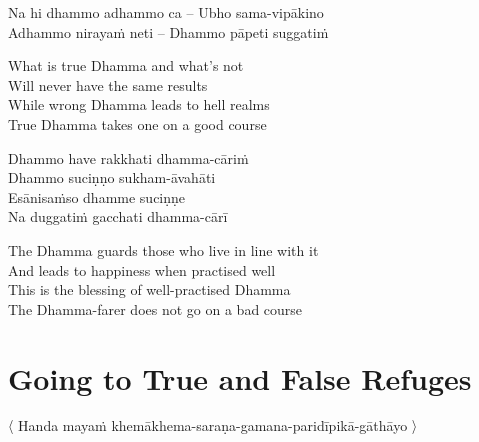\suttaRef{[SN 6.2]}

\begin{twochants}
  Na hi dhammo adhammo ca – Ubho sama-vipākino\\
  Adhammo nirayaṁ neti – Dhammo pāpeti suggatiṁ
\end{twochants}

\begin{english-verses}
  What is true Dhamma and what's
  not\\
  Will never have the same results\\
  While wrong
  Dhamma leads to hell realms\\
  True Dhamma takes one on a good course
\end{english-verses}

Dhammo have rakkhati dhamma-cāriṁ\\
Dhammo suciṇṇo sukham-āvahāti\\
Esānisaṁso dhamme suciṇṇe\\
Na duggatiṁ gacchati dhamma-cārī

\begin{english-verses}
  The Dhamma guards those who live in line with it\\
  And leads to happiness when practised well\\
  This is the blessing of well-practised Dhamma\\
  The Dhamma-farer does not go on a bad course
\end{english-verses}

\suttaRef{[Thag 4.10]}


\section{Going to True and False Refuges}
\label{true-false-refuges}

\begin{leader}
  〈 Handa mayaṁ khemākhema-saraṇa-gamana-paridīpikā-gāthāyo 〉

\end{leader}

